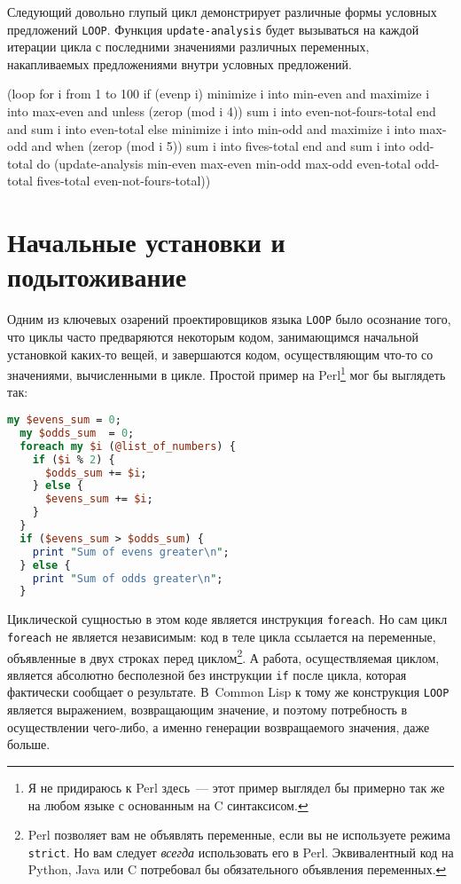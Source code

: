 Следующий довольно глупый цикл демонстрирует различные формы условных предложений
\lstinline{LOOP}. Функция \lstinline{update-analysis} будет вызываться на каждой итерации цикла с
последними значениями различных переменных, накапливаемых пред\-ло\-же\-ния\-ми внутри условных
предложений.

\begin{myverb}
(loop for i from 1 to 100
      if (evenp i)
        minimize i into min-even and 
        maximize i into max-even and
        unless (zerop (mod i 4))
          sum i into even-not-fours-total
        end
        and sum i into even-total
      else
        minimize i into min-odd and
        maximize i into max-odd and
        when (zerop (mod i 5)) 
          sum i into fives-total
        end
        and sum i into odd-total
      do (update-analysis min-even
                          max-even
                          min-odd
                          max-odd
                          even-total
                          odd-total
                          fives-total
                          even-not-fours-total))
\end{myverb}

\section{Начальные установки и подытоживание}

Одним из ключевых озарений проектировщиков языка \lstinline{LOOP} было осознание того, что
циклы часто предваряются некоторым кодом, занимающимся начальной установкой каких-то
вещей, и завершаются кодом, осуществляющим что-то со значениями, вычисленными в
цикле. Простой пример на Perl\footnote{Я не придираюсь к Perl здесь~--- этот пример
  выглядел бы примерно так же на любом языке с основанным на C синтаксисом.} мог бы
выглядеть так:

\begin{lstlisting}[language=Perl]
my $evens_sum = 0;
  my $odds_sum  = 0;
  foreach my $i (@list_of_numbers) {
    if ($i % 2) {
      $odds_sum += $i;
    } else {
      $evens_sum += $i;
    }
  }
  if ($evens_sum > $odds_sum) {
    print "Sum of evens greater\n";
  } else {
    print "Sum of odds greater\n";
  }
\end{lstlisting}

Циклической сущностью в этом коде является инструкция \lstinline{foreach}. Но сам цикл
\lstinline{foreach} не является независимым: код в теле цикла ссылается на переменные,
объявленные в двух строках перед циклом\footnote{Perl позволяет вам не объявлять
  переменные, если вы не используете режима \lstinline{strict}. Но вам следует \textit{всегда}
  использовать его в Perl. Эквивалентный код на Python, Java или C потребовал бы
  обязательного объявления переменных.}. А работа, осуществляемая циклом, является
абсолютно бесполезной без инструкции \lstinline{if} после цикла, которая фактически сообщает о
результате. В~Common Lisp к тому же конструкция \lstinline{LOOP} является выражением,
возвращающим значение, и поэтому потребность в осуществлении чего-либо, а именно генерации
возвращаемого значения, даже больше.

